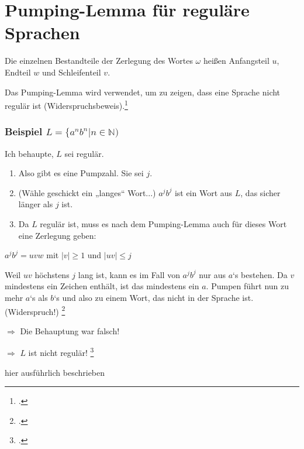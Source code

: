 \documentclass{bschlangaul-theorie}
\begin{document}
\chapter{Pumping-Lemma für reguläre Sprachen}

\noindent
\bPumpingRegulaer

Die einzelnen Bestandteile der Zerlegung des Wortes $\omega$ heißen
Anfangsteil $u$, Endteil $w$ und Schleifenteil $v$.%

\noindent
Das Pumping-Lemma wird verwendet, um zu zeigen, dass eine
Sprache nicht regulär ist (Widerspruchsbeweis).\footcite[Seite 63]{theo:fs:1}

%

\subsection{Beispiel $L = \{a^n b^n | n \in \mathbb{N})$}

Ich behaupte, $L$ sei regulär.

\begin{enumerate}
\item Also gibt es eine Pumpzahl. Sie sei $j$.

\item (Wähle geschickt ein „langes“ Wort...)
$a^j b^j$ ist ein Wort aus $L$, das sicher länger als $j$ ist.

\item Da $L$ regulär ist, muss es nach dem Pumping-Lemma auch für dieses
Wort eine Zerlegung geben:
\end{enumerate}

\begin{center}
$a^j b^j = uvw$ mit $|v| \geq 1$ und $|uv| \leq j$
\end{center}

\noindent
Weil $uv$ höchstens $j$ lang ist, kann es im Fall von $a^j b^j$ nur aus
$a$‘s bestehen. Da $v$ mindestens ein Zeichen enthält, ist das
mindestens ein $a$. Pumpen führt nun zu mehr $a$‘s als $b$‘s und also zu
einem Wort, das nicht in der Sprache ist. (Widerspruch!)
\footcite{wiki:pumping}

$\Rightarrow$ Die Behauptung war falsch!

$\Rightarrow$ $L$ ist nicht regulär!
\footcite[Seite 63-64]{theo:fs:1}

hier ausführlich beschrieben 

\literatur
\end{document}
